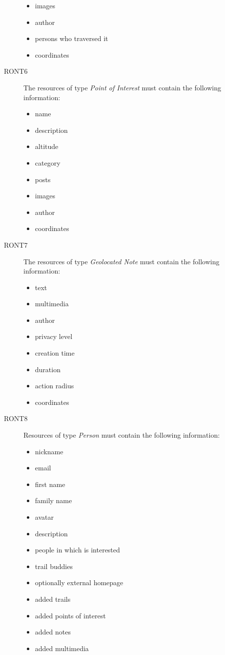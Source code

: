 \begin{description}
\begin{itemize}
\item images
\item author
\item persons who traversed it
\item coordinates
\end{itemize}
\item[RONT6] The resources of type \textit{Point of Interest} must contain the following information:
\begin{itemize}
\item name
\item description
\item altitude
\item category
\item posts
\item images
\item author
\item coordinates
\end{itemize}
\item[RONT7] The resources of type \textit{Geolocated Note} must contain the following information:
\begin{itemize}
\item text
\item multimedia
\item author
\item privacy level
\item creation time
\item duration
\item action radius
\item coordinates
\end{itemize}
\item[RONT8] Resources of type \textit{Person} must contain the following information:
\begin{itemize}
\item nickname
\item email
\item first name
\item family name
\item avatar
\item description
\item people in which is interested
\item trail buddies
\item optionally external homepage
\item added trails
\item added points of interest
\item added notes
\item added multimedia

\end{itemize}
\end{description}

